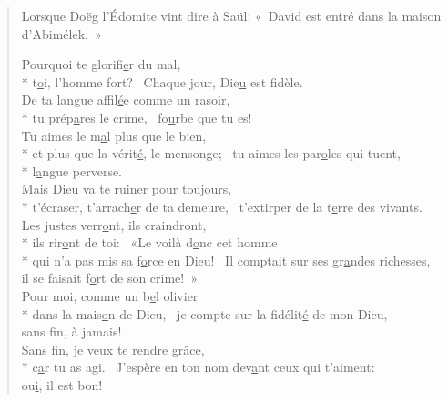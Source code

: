 
\begin{verse}
Lorsque Doëg l’Édomite vint dire à Saül: « David est entré dans la maison d’Abimélek. »

Pourquoi te glorifi\underline{e}r du mal, \\*
t\underline{o}i, l’homme fort?~\psalmstar
Chaque jour, Die\underline{u} est fidèle. \\

De ta langue affil\underline{é}e comme un rasoir, \\*
tu prép\underline{a}res le crime,~\psalmstar
fo\underline{u}rbe que tu es! \\

Tu aimes le m\underline{a}l plus que le bien, \\*
et plus que la vérit\underline{é}, le mensonge;~\psalmstar
{}tu aimes les par\underline{o}les qui tuent, \\*
l\underline{a}ngue perverse. \\

Mais Dieu va te ruin\underline{e}r pour toujours, \\*
t’écraser, t’arrach\underline{e}r de ta demeure,~\psalmstar
t’extirper de la t\underline{e}rre des vivants. \\

Les justes verr\underline{o}nt, ils craindront, \\*
ils rir\underline{o}nt de toi:~\psalmdagger
{}«Le voilà d\underline{o}nc cet homme \\*
qui n’a pas mis sa f\underline{o}rce en Dieu!~\psalmstar
Il comptait sur ses gr\underline{a}ndes richesses, \\
il se faisait f\underline{o}rt de son crime! » \\

Pour moi, comme un b\underline{e}l olivier \\*
dans la mais\underline{o}n de Dieu,~\psalmstar
je compte sur la fidélit\underline{é} de mon Dieu, \\
sans f\underline{i}n, à jamais! \\

Sans fin, je veux te r\underline{e}ndre grâce, \\*
c\underline{a}r tu as agi.~\psalmstar
J’espère en ton nom dev\underline{a}nt ceux qui t’aiment: \\
ou\underline{i}, il est bon! \\
\end{verse}

